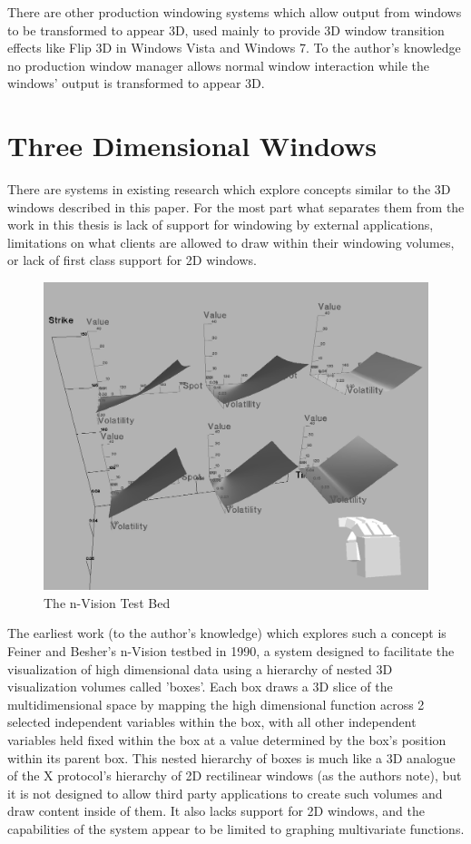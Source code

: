 There are other production windowing systems which allow output from windows to be transformed to appear 3D, used mainly to provide 3D window transition effects like Flip 3D in Windows Vista and Windows 7. To the author's knowledge no production window manager allows normal window interaction while the windows' output is transformed to appear 3D.

\section{Three Dimensional Windows}

There are systems in existing research which explore concepts similar to the 3D windows described in this paper. For the most part what separates them from the work in this thesis is lack of support for windowing by external applications, limitations on what clients are allowed to draw within their windowing volumes, or lack of first class support for 2D windows.

\begin{figure}[ht!]
\centering
\includegraphics[width=1.0\textwidth]{images/n-vision.png}
\caption{The n-Vision Test Bed \protect\cite{nvision}}
\end{figure}

The earliest work (to the author's knowledge) which explores such a concept is Feiner and Besher's n-Vision testbed \cite{nvision} in 1990, a system designed to facilitate the visualization of high dimensional data using a hierarchy of nested 3D visualization volumes called 'boxes'. Each box draws a 3D slice of the multidimensional space by mapping the high dimensional function across 2 selected independent variables within the box, with all other independent variables held fixed within the box at a value determined by the box's position within its parent box. This nested hierarchy of boxes is much like a 3D analogue of the X protocol's hierarchy of 2D rectilinear windows (as the authors note), but it is not designed to allow third party applications to create such volumes and draw content inside of them. It also lacks support for 2D windows, and the capabilities of the system appear to be limited to graphing multivariate functions.

